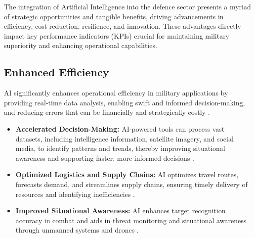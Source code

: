 The integration of Artificial Intelligence into the defence sector presents a myriad of strategic opportunities and tangible benefits, driving advancements in efficiency, cost reduction, resilience, and innovation. These advantages directly impact key performance indicators (KPIs) crucial for maintaining military superiority and enhancing operational capabilities.

\subsection{Enhanced Efficiency}
AI significantly enhances operational efficiency in military applications by providing real-time data analysis, enabling swift and informed decision-making, and reducing errors that can be financially and strategically costly \cite{IronVector_Benefits}. 
\begin{itemize}
    \item \textbf{Accelerated Decision-Making:} AI-powered tools can process vast datasets, including intelligence information, satellite imagery, and social media, to identify patterns and trends, thereby improving situational awareness and supporting faster, more informed decisions \cite{Scielo_Benefits, AdaptForward_Benefits}.
    \item \textbf{Optimized Logistics and Supply Chains:} AI optimizes travel routes, forecasts demand, and streamlines supply chains, ensuring timely delivery of resources and identifying inefficiencies \cite{MarketUS_Benefits, SDI_Benefits}.
    \item \textbf{Improved Situational Awareness:} AI enhances target recognition accuracy in combat and aids in threat monitoring and situational awareness through unmanned systems and drones \cite{MarketUS_Benefits}.
\end{itemize}

